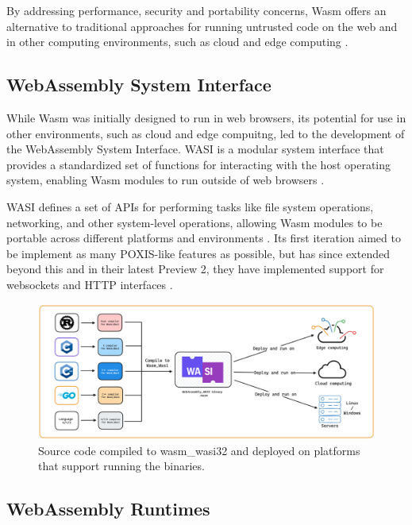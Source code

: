\documentclass[
  table]{report}
\begin{document}
By addressing performance, security and portability concerns, \ac{Wasm}
offers an alternative to traditional approaches for running untrusted
code on the web and in other computing environments, such as cloud and
edge computing \citep{haasBringingWebSpeed2017}.

\subsection{WebAssembly System Interface}

While \ac{Wasm} was initially designed to run in web browsers, its
potential for use in other environments, such as cloud and edge
compuitng, led to the development of the WebAssembly System Interface.
\ac{WASI} is a modular system interface that provides a standardized set
of functions for interacting with the host operating system, enabling
\ac{Wasm} modules to run outside of web browsers \citep{WASIDev}.

\ac{WASI} defines a set of APIs for performing tasks like file system
operations, networking, and other system-level operations, allowing
\ac{Wasm} modules to be portable across different platforms and
environments \citep{WASIDev}. Its first iteration aimed to be implement
as many POXIS-like features as possible, but has since extended beyond
this and in their latest Preview 2, they have implemented support for
websockets and HTTP interfaces \citep{WASIPreview2README}.

\begin{figure}[H]
\centering
  \includegraphics{assets/3-wasi-figure.png}
  \caption{Source code compiled to wasm\_wasi32 and deployed on platforms that support running the binaries.}
  \label{fig:wasm-wasi}
\end{figure}

\subsection{WebAssembly Runtimes}
\label{sect:wasm_runtimes}
\end{document}
